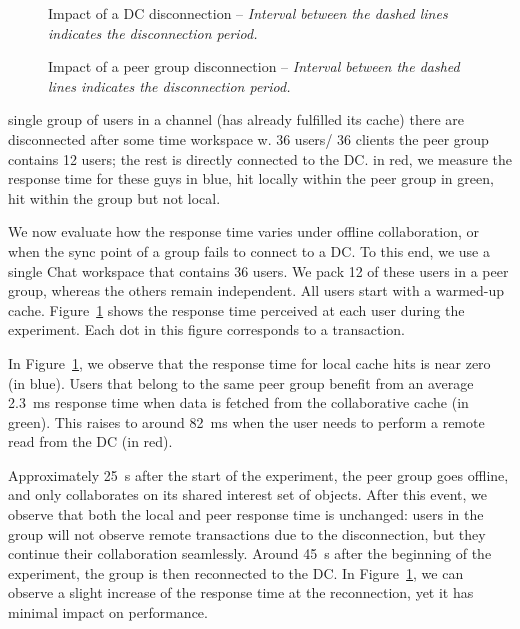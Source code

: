 
\begin{figure}
    \begin{center}
        \scalebox{0.7}{}
    \end{center}
    \caption{Impact of a DC disconnection -- \emph{\small{Interval between the dashed lines indicates the disconnection period.}}}
    \label{fig:plot-rt-offline-dc}
\end{figure}
    
\begin{figure}
    \begin{center}
        \scalebox{0.7}{}
    \end{center}
    \caption{Impact of a peer group disconnection -- \emph{\small{Interval between the dashed lines indicates the disconnection period.}}}
    \label{fig:plot-rt-offline-pop}
\end{figure}

single group of users in a channel (has already fulfilled its cache)
there are disconnected after some time
workspace w. 36 users/ 36 clients
the peer group contains 12 users; the rest is directly connected to the DC.
in red, we measure the response time for these guys
in blue, hit locally within the peer group
in green, hit within the group but not local.

We now evaluate how the response time varies under offline collaboration, or 
when the sync point of a group fails to connect to a DC.
%
To this end, we use a single \system{}Chat workspace that contains 36 users.
We pack 12 of these users in a peer group, whereas the others remain independent.
All users start with a warmed-up cache.
%
Figure~\ref{fig:plot-rt-offline-dc} shows the response time perceived at each 
user during the experiment.
%
Each dot in this figure corresponds to a transaction.

In Figure~\ref{fig:plot-rt-offline-dc}, we observe that the response time for local 
cache hits is near zero (in blue).
Users that belong to the same peer group benefit from an average 2.3~ms response time 
when data is fetched from the collaborative cache (in green).
This raises to around 82~ms when the user needs to perform a remote read from 
the DC (in red).

Approximately 25~s after the start of the experiment, 
the peer group goes offline, 
and only collaborates on its shared interest set of objects.
After this event, we observe that both the local and peer response time is unchanged:
users in the group will not observe remote transactions due to the 
disconnection, 
but they continue their collaboration seamlessly.
%
Around 45~s after the beginning of the experiment, 
the group is then reconnected to the DC.
In Figure~\ref{fig:plot-rt-offline-dc}, 
we can observe a slight increase of the response time at the reconnection, 
yet it has minimal impact on performance.

